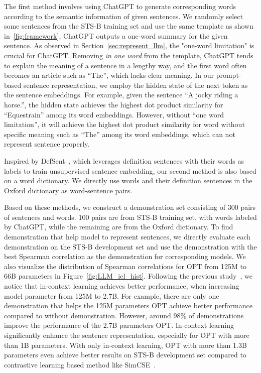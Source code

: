 \documentclass{article}
\begin{document}
The first method involves using ChatGPT to generate corresponding words according to the semantic information of given sentences. We randomly select some sentences from the STS-B training set and use the same template as shown in~\ref{fig:framework}, ChatGPT outputs a one-word summary for the given sentence.
As observed in Section~\ref{sec:represent_llm}, the "one-word limitation" is crucial for ChatGPT. 
Removing \textit{in one word} from the template, ChatGPT tends to explain the meaning of a sentence in a lengthy way, and the first word often becomes an article such as ``The'', which lacks clear meaning.
In our prompt-based sentence representation, we employ the hidden state of the next token as the sentence embeddings.
For example, given the sentence ``A jocky riding a horse.'', the hidden state achieves the highest dot product similarity for ``Equestrain'' among its word embeddings.
However, without ``one word limitation'', it will achieve the highest dot product similarity for word without specific meaning such as ``The'' among its word embeddings, which can not represent sentence properly.

Inspired by DefSent~\cite{tsukagoshi-etal-2021-defsent}, which leverages definition sentences with their words as labels to train unsupervised sentence embedding,
our second method is also based on a word dictionary. We directly use words and their definition sentences in the Oxford dictionary as word-sentence pairs.



Based on these methods, we construct a demonstration set consisting of 300 pairs of sentences and words.
100 pairs are from STS-B training set, with words labeled by ChatGPT, while the remaining are from the Oxford dictionary.
To find demonstration that help model to represent sentences, we directly evaluate each demonstration on the STS-B development set and use the demonstration with the best Spearman correlation as the demonstration for corresponding models.
We also visualize the distribution of Spearman correlations for OPT from 125M to 66B parameters in Figure~\ref{fig:LLM_icl_hist}.
Following the previous study~\cite{kaplan2020scaling}, we notice that in-context learning achieves better performance, when increasing model parameter from 125M to 2.7B.
For example, there are only one demonstration that helps the 125M parameters OPT achieve better performance compared to without demonstration.
However, around 98\% of demonstrations improve the performance of the 2.7B parameters OPT.
In-context learning significantly enhance the sentence representation, especially for OPT with more than 1B parameters.
With only in-context learning, OPT with more than 1.3B parameters even achieve better results on STS-B development set compared to contrastive learning based method like SimCSE~\cite{gao2021simcse}.
\end{document}
